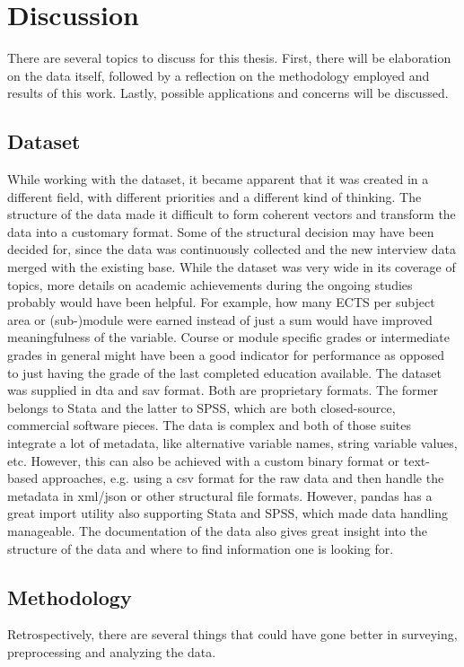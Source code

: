 
\section{Discussion}
\label{sec:discussion}
There are several topics to discuss for this thesis. First, there will be elaboration on the data itself, followed by a reflection on the methodology employed and results of this work. Lastly, possible applications and concerns will be discussed.

\subsection{Dataset}
While working with the dataset, it became apparent that it was created in a different field, with different priorities and a different kind of thinking. The structure of the data made it difficult to form coherent vectors and transform the data into a customary format. Some of the structural decision may have been decided for, since the data was continuously collected and the new interview data merged with the existing base. While the dataset was very wide in its coverage of topics, more details on academic achievements during the ongoing studies probably would have been helpful. For example, how many ECTS per subject area  or (sub-)module were earned instead of just a sum would have improved meaningfulness of the variable. Course or module specific grades or intermediate grades in general might have been a good indicator for performance as opposed to just having the grade of the last completed education available. The dataset was supplied in dta and sav format. Both are proprietary formats. The former belongs to Stata and the latter to SPSS, which are both closed-source, commercial software pieces. The data is complex and both of those suites integrate a lot of metadata, like alternative variable names, string variable values, etc. However, this can also be achieved with a custom binary format or text-based approaches, e.g. using a csv format for the raw data and then handle the metadata in xml/json or other structural file formats. However, pandas has a great import utility also supporting Stata and SPSS, which made data handling manageable. The documentation of the data also gives great insight into the structure of the data and where to find information one is looking for.

\subsection{Methodology}
Retrospectively, there are several things that could have gone better in surveying, preprocessing and analyzing the data.

